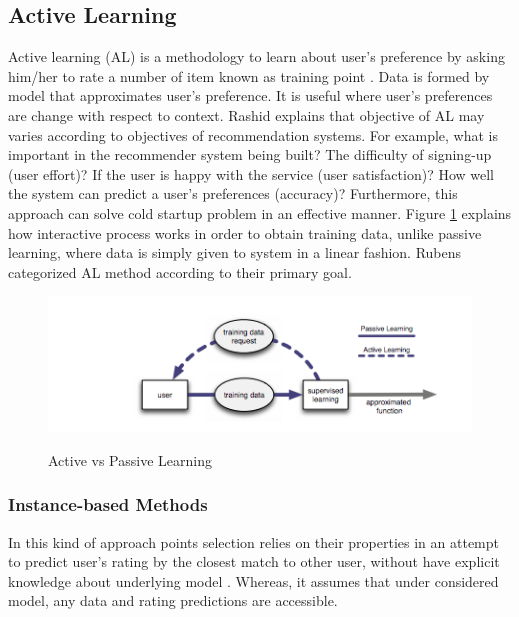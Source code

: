 \subsection{Active Learning}

Active learning (AL) is a methodology to learn about user’s preference by asking him/her to rate a number of item known as training point \cite{rubens2011active}. Data is formed by model that approximates user’s preference. It is useful where user’s preferences are change with respect to context. Rashid \cite{rashid2008learning} explains that objective of AL may varies according to objectives of recommendation systems. For example, what is important in the recommender system being built? The difficulty of signing-up (user effort)? If the user is happy with the service (user satisfaction)? How well the system can predict a user’s preferences (accuracy)? Furthermore, this approach can solve cold startup problem in an effective manner. Figure \ref{fig:ch2_active_learning} explains how interactive process works in order to obtain training data, unlike passive learning, where data is simply given to system in a linear fashion. Rubens \cite{ rubens2011active} categorized AL method according to their primary goal.  

\begin{figure}[h]
	\centering
	\includegraphics[width=1\linewidth]{figures/ch2_active_learning.png}
	\caption{Active vs Passive Learning}
	\cite{ rubens2011active}
	\label{fig:ch2_active_learning}
\end{figure}

\subsubsection{Instance-based Methods}

In this kind of approach points selection relies on their properties in an attempt to predict user’s rating by the closest match to other user, without have explicit knowledge about underlying model \cite{adomavicius2005toward}. Whereas, it assumes that under considered model, any data and rating predictions are accessible.

